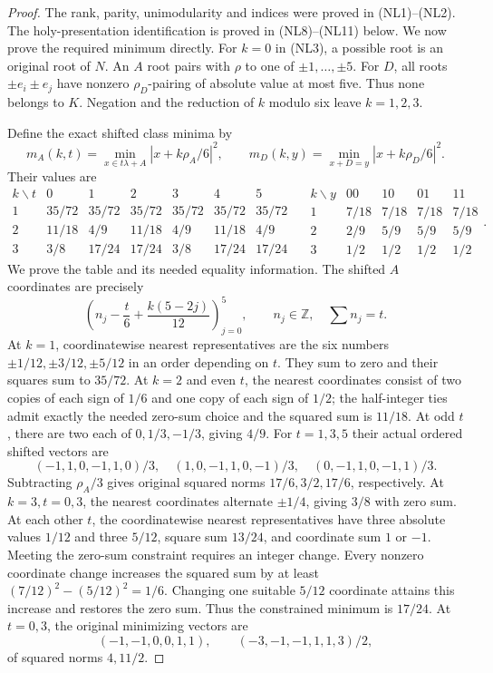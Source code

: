 \begin{proof}
The rank, parity, unimodularity and indices were proved in
(NL1)--(NL2). The holy-presentation identification is proved in
(NL8)--(NL11) below. We now prove the required minimum directly.
For $k=0$ in (NL3), a possible root is an original root of $N$.
An $A$ root pairs with $\rho$ to one of $\pm1,\ldots,\pm5$.
For $D$, all roots $\pm e_i\pm e_j$ have nonzero $\rho_D$-pairing
of absolute value at most five. Thus none belongs to $K$.
Negation and the reduction of $k$ modulo six leave $k=1,2,3$.

Define the exact shifted class minima by
\[
 m_A(k,t)=\min_{x\in t\lambda+A}|x+k\rho_A/6|^2,\qquad
 m_D(k,y)=\min_{x+D=y}|x+k\rho_D/6|^2.
\]
Their values are
\[
 \begin{array}{c|rrrrrr}
 k\backslash t&0&1&2&3&4&5\\\hline
 1&35/72&35/72&35/72&35/72&35/72&35/72\\
 2&11/18&4/9&11/18&4/9&11/18&4/9\\
 3&3/8&17/24&17/24&3/8&17/24&17/24
 \end{array}
 \quad
 \begin{array}{c|rrrr}
 k\backslash y&00&10&01&11\\\hline
 1&7/18&7/18&7/18&7/18\\
 2&2/9&5/9&5/9&5/9\\
 3&1/2&1/2&1/2&1/2
 \end{array}.
 \tag{NL4}
\]
We prove the table and its needed equality information.
The shifted $A$ coordinates are precisely
\[
 \left(n_j-\frac t6+\frac{k(5-2j)}{12}\right)_{j=0}^5,
               \qquad n_j\in\mathbb Z,\quad\sum n_j=t.
 \tag{NL5}
\]
At $k=1$, coordinatewise nearest representatives are the six
numbers $\pm1/12,\pm3/12,\pm5/12$ in an order depending on $t$.
They sum to zero and their squares sum to $35/72$.
At $k=2$ and even $t$, the nearest coordinates consist of
two copies of each sign of $1/6$ and one copy of each sign of
$1/2$; the half-integer ties admit exactly the needed zero-sum
choice and the squared sum is $11/18$.
At odd $t$, there are two each of $0,1/3,-1/3$, giving $4/9$.
For $t=1,3,5$ their actual ordered shifted vectors are
\[
 (-1,1,0,-1,1,0)/3,\quad
 (1,0,-1,1,0,-1)/3,\quad
 (0,-1,1,0,-1,1)/3.
 \tag{NL6}
\]
Subtracting $\rho_A/3$ gives original squared norms
$17/6,3/2,17/6$, respectively.
At $k=3,t=0,3$, the nearest coordinates alternate $\pm1/4$,
giving $3/8$ with zero sum.
At each other $t$, the coordinatewise nearest representatives
have three absolute values $1/12$ and three $5/12$, square sum
$13/24$, and coordinate sum $1$ or $-1$.
Meeting the zero-sum constraint requires an integer change.
Every nonzero coordinate change increases the squared sum by
at least $(7/12)^2-(5/12)^2=1/6$.
Changing one suitable $5/12$ coordinate attains this increase
and restores the zero sum. Thus the constrained minimum is
$17/24$. At $t=0,3$, the original minimizing vectors are
\[
 (-1,-1,0,0,1,1),\qquad (-3,-1,-1,1,1,3)/2,
 \tag{NL7}
\]
of squared norms $4,11/2$.


\end{proof}
